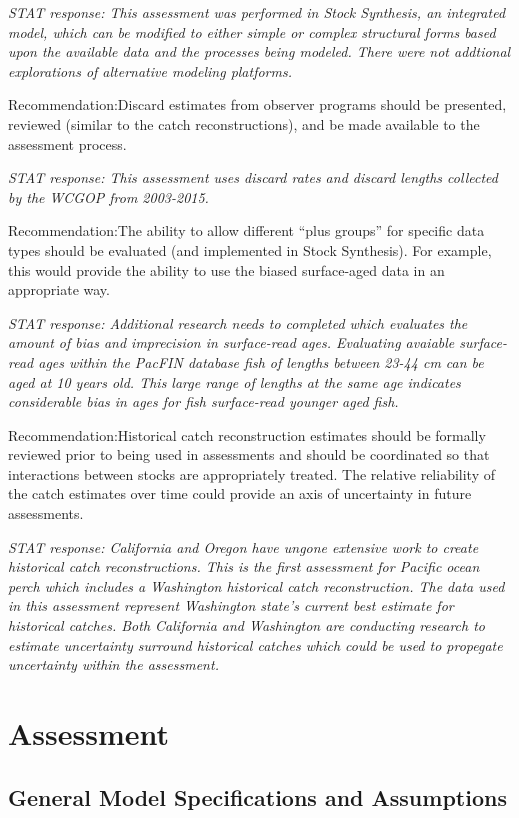 \documentclass[12pt,]{article}
\begin{document}
\emph{STAT response: This assessment was performed in Stock Synthesis,
an integrated model, which can be modified to either simple or complex
structural forms based upon the available data and the processes being
modeled. There were not addtional explorations of alternative modeling
platforms.}

Recommendation:Discard estimates from observer programs should be
presented, reviewed (similar to the catch reconstructions), and be made
available to the assessment process.

\emph{STAT response: This assessment uses discard rates and discard
lengths collected by the WCGOP from 2003-2015.}

Recommendation:The ability to allow different ``plus groups'' for
specific data types should be evaluated (and implemented in Stock
Synthesis). For example, this would provide the ability to use the
biased surface-aged data in an appropriate way.

\emph{STAT response: Additional research needs to completed which
evaluates the amount of bias and imprecision in surface-read ages.
Evaluating avaiable surface-read ages within the PacFIN database fish of
lengths between 23-44 cm can be aged at 10 years old. This large range
of lengths at the same age indicates considerable bias in ages for fish
surface-read younger aged fish.}

Recommendation:Historical catch reconstruction estimates should be
formally reviewed prior to being used in assessments and should be
coordinated so that interactions between stocks are appropriately
treated. The relative reliability of the catch estimates over time could
provide an axis of uncertainty in future assessments.

\emph{STAT response: California and Oregon have ungone extensive work to
create historical catch reconstructions. This is the first assessment
for Pacific ocean perch which includes a Washington historical catch
reconstruction. The data used in this assessment represent Washington
state's current best estimate for historical catches. Both California
and Washington are conducting research to estimate uncertainty surround
historical catches which could be used to propegate uncertainty within
the assessment.}

\section{Assessment}\label{assessment}

\subsection{General Model Specifications and
Assumptions}\label{general-model-specifications-and-assumptions}
\end{document}
